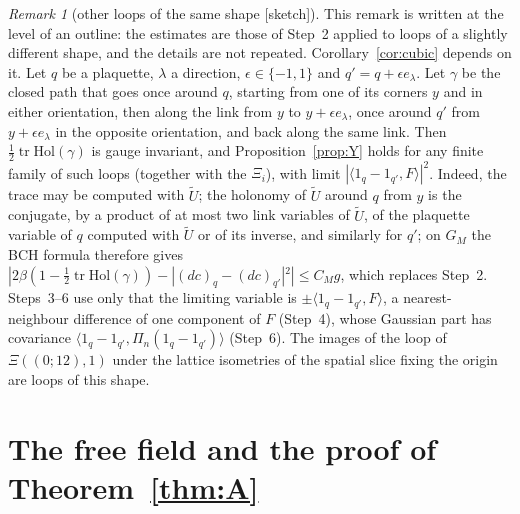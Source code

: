 \documentclass[11pt,a4paper]{article}
\theoremstyle{plain}
\theoremstyle{definition}
\theoremstyle{remark}
\newtheorem{remark}[theorem]{Remark}
\numberwithin{equation}{section}
\newcommand{\tr}{\operatorname{tr}}
\newcommand{\st}[1]{\textsf{[#1]}}
\newcommand{\Tg}{\widetilde U}
\begin{document}
\begin{remark}[other loops of the same shape \st{sketch}]\label{rem:loops}
This remark is written at the level of an outline: the estimates are those of Step~2 applied to loops of a slightly different shape, and the details are not repeated.
Corollary~\ref{cor:cubic} depends on it.
Let $q$ be a plaquette, $\lambda$ a direction, $\epsilon\in\{-1,1\}$ and $q'=q+\epsilon e_\lambda$. Let $\gamma$ be the closed path that
goes once around $q$, starting from one of its corners $y$ and in either orientation, then along the link from $y$ to $y+\epsilon e_\lambda$,
once around $q'$ from $y+\epsilon e_\lambda$ in the opposite orientation, and back along the same link. Then $\frac12\tr\mathrm{Hol}(\gamma)$
is gauge invariant, and Proposition~\ref{prop:Y} holds for any finite family of such loops (together with the $\Xi_i$), with limit
$|\langle1_q-1_{q'},F\rangle|^2$. Indeed, the trace may be computed with $\Tg$; the holonomy of $\Tg$ around $q$ from $y$ is the conjugate,
by a product of at most two link variables of $\Tg$, of the plaquette variable of $q$ computed with $\Tg$ or of its inverse, and similarly
for $q'$; on $G_M$ the BCH formula therefore gives
$|2\beta(1-\frac12\tr\mathrm{Hol}(\gamma))-|(dc)_q-(dc)_{q'}|^2|\le C_Mg$, which replaces Step~2. Steps~3--6 use only that the limiting
variable is $\pm\langle1_q-1_{q'},F\rangle$, a nearest-neighbour difference of one component of $F$ (Step~4), whose Gaussian part has
covariance $\langle1_q-1_{q'},\Pi_n(1_q-1_{q'})\rangle$ (Step~6). The images of the loop of $\Xi((0;12),1)$ under the lattice isometries of
the spatial slice fixing the origin are loops of this shape.
\end{remark}

\section{The free field and the proof of Theorem~\ref{thm:A}}\label{sec:A}
\end{document}
